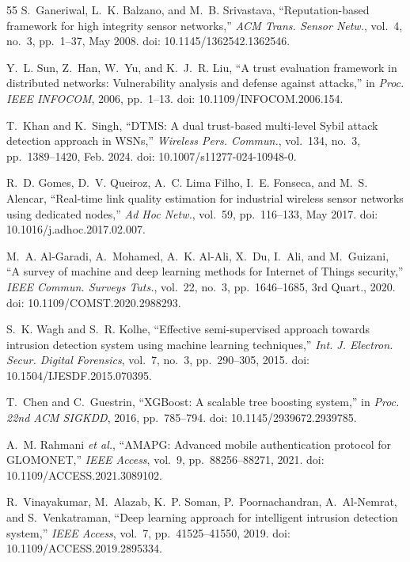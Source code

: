 \documentclass[conference]{IEEEtran}
\begin{document}
\begin{enumerate}
\begin{thebibliography}{55}
S.~Ganeriwal, L.~K. Balzano, and M.~B. Srivastava, ``Reputation-based framework for high integrity sensor networks,'' \textit{ACM Trans. Sensor Netw.}, vol.~4, no.~3, pp.~1--37, May 2008. doi: 10.1145/1362542.1362546.

Y.~L. Sun, Z.~Han, W.~Yu, and K.~J.~R. Liu, ``A trust evaluation framework in distributed networks: Vulnerability analysis and defense against attacks,'' in \textit{Proc. IEEE INFOCOM}, 2006, pp.~1--13. doi: 10.1109/INFOCOM.2006.154.

T.~Khan and K.~Singh, ``DTMS: A dual trust-based multi-level Sybil attack detection approach in WSNs,'' \textit{Wireless Pers. Commun.}, vol.~134, no.~3, pp.~1389--1420, Feb. 2024. doi: 10.1007/s11277-024-10948-0.

R.~D. Gomes, D.~V. Queiroz, A.~C. Lima Filho, I.~E. Fonseca, and M.~S. Alencar, ``Real-time link quality estimation for industrial wireless sensor networks using dedicated nodes,'' \textit{Ad Hoc Netw.}, vol.~59, pp.~116--133, May 2017. doi: 10.1016/j.adhoc.2017.02.007.

M.~A. Al-Garadi, A.~Mohamed, A.~K. Al-Ali, X.~Du, I.~Ali, and M.~Guizani, ``A survey of machine and deep learning methods for Internet of Things security,'' \textit{IEEE Commun. Surveys Tuts.}, vol.~22, no.~3, pp.~1646--1685, 3rd Quart., 2020. doi: 10.1109/COMST.2020.2988293.

S.~K. Wagh and S.~R. Kolhe, ``Effective semi-supervised approach towards intrusion detection system using machine learning techniques,'' \textit{Int. J. Electron. Secur. Digital Forensics}, vol.~7, no.~3, pp.~290--305, 2015. doi: 10.1504/IJESDF.2015.070395.

T.~Chen and C.~Guestrin, ``XGBoost: A scalable tree boosting system,'' in \textit{Proc. 22nd ACM SIGKDD}, 2016, pp.~785--794. doi: 10.1145/2939672.2939785.

A.~M. Rahmani \textit{et al.}, ``AMAPG: Advanced mobile authentication protocol for GLOMONET,'' \textit{IEEE Access}, vol.~9, pp.~88256--88271, 2021. doi: 10.1109/ACCESS.2021.3089102.

R.~Vinayakumar, M.~Alazab, K.~P. Soman, P.~Poornachandran, A.~Al-Nemrat, and S.~Venkatraman, ``Deep learning approach for intelligent intrusion detection system,'' \textit{IEEE Access}, vol.~7, pp.~41525--41550, 2019. doi: 10.1109/ACCESS.2019.2895334.


\end{thebibliography}
\end{enumerate}
\end{document}
